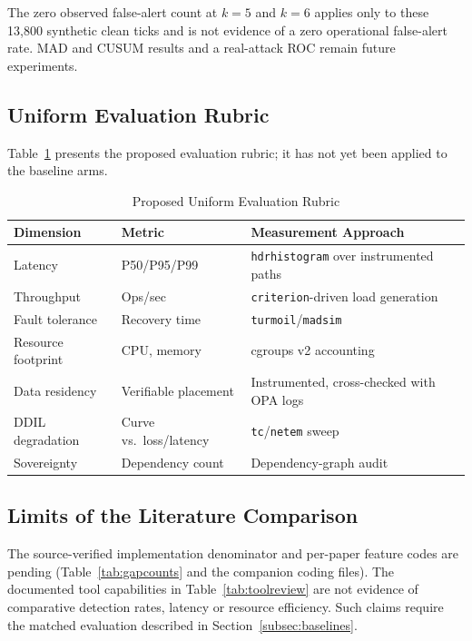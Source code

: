 \documentclass{ieeeaccess}
\renewcommand{\textbf}[1]{#1}
\begin{document}
\begin{samepage}
The zero observed false-alert count at $k=5$ and $k=6$ applies only to these 13,800 synthetic clean ticks and is not evidence of a zero operational false-alert rate. MAD and CUSUM results and a real-attack ROC remain future experiments.
\end{samepage}

\subsection{Uniform Evaluation Rubric}
\label{subsec:rubric}

Table~\ref{tab:rubric} presents the proposed evaluation rubric; it has not yet been applied to the baseline arms.

\begin{table}[ht]
\caption{Proposed Uniform Evaluation Rubric}
\label{tab:rubric}
\centering
\setlength{\tabcolsep}{2pt}
\begin{tabular}{|p{50pt}|p{60pt}|p{75pt}|}
\hline
\textbf{Dimension} & \textbf{Metric} & {Measurement Approach} \\
\hline
Latency & P50/P95/P99 & \texttt{hdrhistogram} over instrumented paths \\
\hline
Throughput & Ops/sec & \texttt{criterion}-driven load generation \\
\hline
Fault tolerance & Recovery time & \texttt{turmoil}/\texttt{madsim} \\
\hline
Resource footprint & CPU, memory & cgroups v2 accounting \\
\hline
Data residency & Verifiable placement & Instrumented, cross-checked with OPA logs \\
\hline
DDIL degradation & Curve vs.\ loss/latency & \texttt{tc}/\texttt{netem} sweep \\
\hline
Sovereignty & Dependency count & Dependency-graph audit \\
\hline
\end{tabular}
\end{table}

\subsection{Limits of the Literature Comparison}

The source-verified implementation denominator and per-paper feature codes are pending (Table~\ref{tab:gapcounts} and the companion coding files). The documented tool capabilities in Table~\ref{tab:toolreview} are not evidence of comparative detection rates, latency or resource efficiency. Such claims require the matched evaluation described in Section~\ref{subsec:baselines}.
\end{document}
